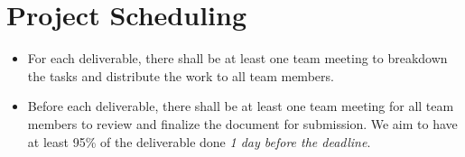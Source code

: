 \documentclass{article}
\begin{document}
\section{Project Scheduling}

\begin{itemize}
\item For each deliverable, there shall be at least one team meeting to breakdown
  the tasks and distribute the work to all team members.
\item Before each deliverable, there shall be at least one team meeting for all
  team members to review and finalize the document for submission. We aim to
  have at least 95\% of the deliverable done \emph{1 day before the deadline}.
\end{itemize}
\end{document}
